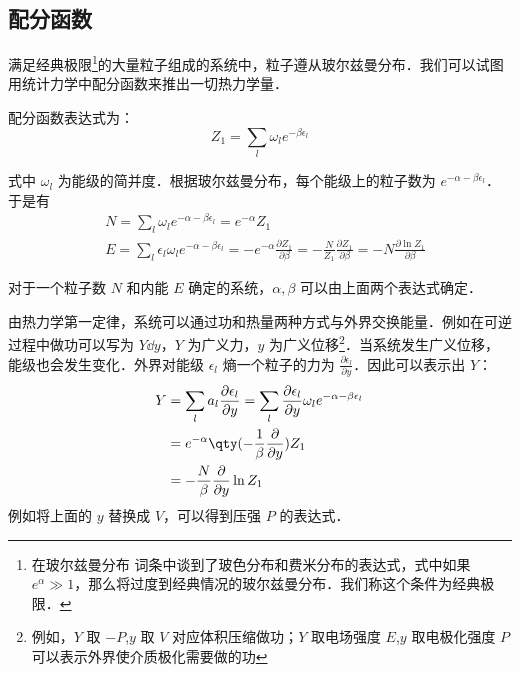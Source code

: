 

\subsection{配分函数}

满足经典极限\footnote{在玻尔兹曼分布 词条中谈到了玻色分布和费米分布的表达式，式中如果 $e^\alpha\gg 1$，那么将过度到经典情况的玻尔兹曼分布．我们称这个条件为经典极限．}的大量粒子组成的系统中，粒子遵从玻尔兹曼分布．我们可以试图用统计力学中配分函数来推出一切热力学量．

配分函数表达式为：
\begin{equation}
Z_1=\sum_l \omega_l e^{-\beta \epsilon_l}
\end{equation}

式中 $\omega_l$ 为能级的简并度．根据玻尔兹曼分布，每个能级上的粒子数为 $e^{-\alpha-\beta\epsilon_l}$．于是有
\begin{equation}
\begin{aligned}
&N=\sum_l \omega_l e^{-\alpha-\beta\epsilon_l}=e^{-\alpha} Z_1\\
&E=\sum_l \epsilon_l \omega_l e^{-\alpha-\beta\epsilon_l}=-e^{-\alpha}\frac{\partial Z_1}{\partial \beta}=-\frac{N}{Z_1}\frac{\partial Z_1}{\partial \beta}=-N\frac{\partial \ln Z_1}{\partial \beta}
\end{aligned}
\end{equation}

对于一个粒子数 $N$ 和内能 $E$ 确定的系统，$\alpha,\beta$ 可以由上面两个表达式确定．

由热力学第一定律，系统可以通过功和热量两种方式与外界交换能量．例如在可逆过程中做功可以写为 $Y\dd y$，$Y$ 为广义力，$y$ 为广义位移\footnote{例如，$Y$ 取 $-P$,$y$ 取 $V$ 对应体积压缩做功；$Y$ 取电场强度 $E$,$y$ 取电极化强度 $P$ 可以表示外界使介质极化需要做的功}．当系统发生广义位移，能级也会发生变化．外界对能级 $\epsilon_l$ 熵一个粒子的力为 $\frac{\partial \epsilon_l}{\partial y}$．因此可以表示出 $Y$：
\begin{equation}
\begin{aligned}
Y&=\sum_l a_l\frac{\partial \epsilon_l}{\partial y}=\sum_l \frac{\partial \epsilon_l}{\partial y}\omega_le^{-\alpha-\beta\epsilon_l}\\
&=e^{-\alpha}\qty(-\frac{1}{\beta}\frac{\partial }{\partial y})Z_1\\
&=-\frac{N}{\beta}\frac{\partial }{\partial y}\ln Z_1
\end{aligned}
\end{equation}
例如将上面的 $y$ 替换成 $V$，可以得到压强 $P$ 的表达式．

